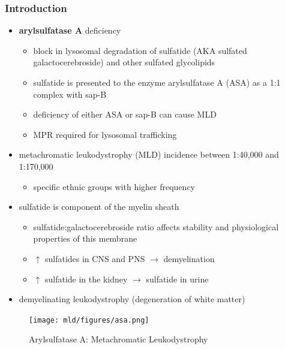 \documentclass[12pt]{scrartcl}
\begin{document}
\subsubsection{Introduction}
\label{sec:org21d0ee1}
\begin{itemize}
\item \textbf{arylsulfatase A} deficiency
\begin{itemize}
\item block in lysosomal degradation of sulfatide (AKA sulfated
galactocerebroside) and other sulfated glycolipids
\item sulfatide is presented to the enzyme arylsulfatase A (ASA) as a
1:1 complex with sap-B
\item deficiency of either ASA or sap-B can cause MLD
\item MPR required for lysosomal trafficking
\end{itemize}
\item metachromatic leukodystrophy (MLD) incidence between 1:40,000 and 1:170,000
\begin{itemize}
\item specific ethnic groups with higher frequency
\end{itemize}

\item sulfatide is component of the myelin sheath
\begin{itemize}
\item sulfatide:galactocerebroside ratio affects stability and
physiological properties of this membrane
\item \(\uparrow\) sulfatides in CNS and PNS \(\to\) demyelination
\item \(\uparrow\) sulfatide in the kidney \(\to\) sulfatide in urine
\end{itemize}
\item demyelinating leukodystrophy (degeneration of white matter)
\end{itemize}

\begin{figure}[htbp]
\centering
\texttt{[image: mld/figures/asa.png]}
\caption{\label{fig:org06c4bca}Arylsulfatase A: Metachromatic Leukodystrophy}
\end{figure}
\end{document}
